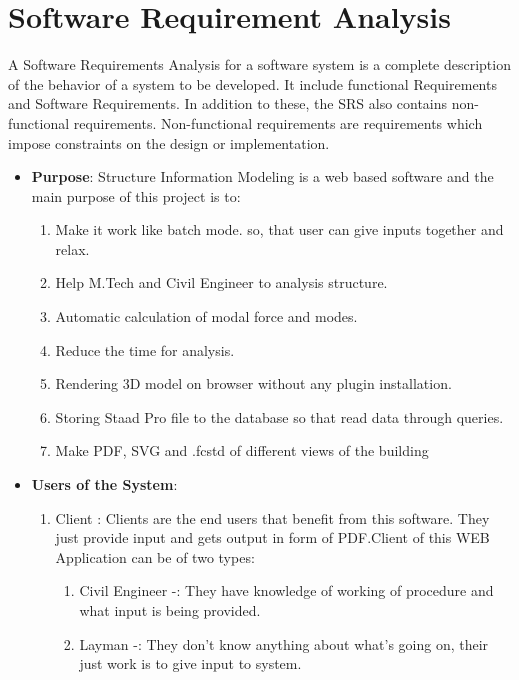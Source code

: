 \section{Software Requirement Analysis}
A Software Requirements Analysis for a software system is a complete description of the behavior
of a system to be developed. It include functional Requirements and Software Requirements. In
addition to these, the SRS also contains non-functional requirements. Non-functional requirements
are requirements which impose constraints on the design or implementation.

\begin{itemize}
\item \textbf{Purpose}: Structure Information Modeling is a web based software and the main purpose of this project
is to:
\begin{enumerate}
\item Make it work like batch mode. so, that user can give inputs together and relax.
\item Help M.Tech and Civil Engineer to analysis structure.
\item Automatic calculation of modal force and modes.
\item Reduce the time for analysis.
\item Rendering 3D model on browser without any plugin installation.
\item Storing Staad Pro file to the database so that read data through queries.
\item Make PDF, SVG and .fcstd of different views of the building
\end{enumerate}

\item \textbf{Users of the System}:
\begin{enumerate}
\item Client : Clients are the end users that benefit from this software. They just provide
input and gets output in form of PDF.Client of this WEB Application can be of two
types:
\begin{enumerate}
\item Civil Engineer -: They have knowledge of working of procedure and what input is
being provided.
\item Layman -: They don’t know anything about what’s going on, their just work is to
give input to system.
\end{enumerate}
\end{enumerate}
\end{itemize}


